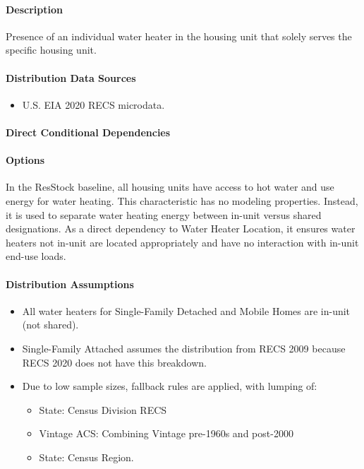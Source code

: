 \paragraph{Description}
% 
Presence of an individual water heater in the housing unit that solely serves the specific housing unit.

\paragraph{Distribution Data Sources}
% 
\begin{itemize}
\item
  U.S. EIA 2020 RECS microdata.
\end{itemize}

\paragraph{Direct Conditional Dependencies}


\paragraph{Options}
In the ResStock baseline, all housing units have access to hot water and use energy for water heating. This characteristic has no modeling properties. Instead, it is used to separate water heating energy between in-unit versus shared designations. As a direct dependency to Water Heater Location, it ensures water heaters not in-unit are located appropriately and have no interaction with in-unit end-use loads.

\paragraph{Distribution Assumptions}
% 
\begin{itemize}
\item
  All water heaters for Single-Family Detached and Mobile Homes are in-unit (not shared).
\item
  Single-Family Attached assumes the distribution from RECS 2009 because RECS 2020 does not have this breakdown.
\item
  Due to low sample sizes, fallback rules are applied, with lumping of:

  \begin{itemize}
  \item
    State: Census Division RECS
  \item
    Vintage ACS: Combining Vintage pre-1960s and post-2000
  \item
    State: Census Region.
  \end{itemize}
\end{itemize}
